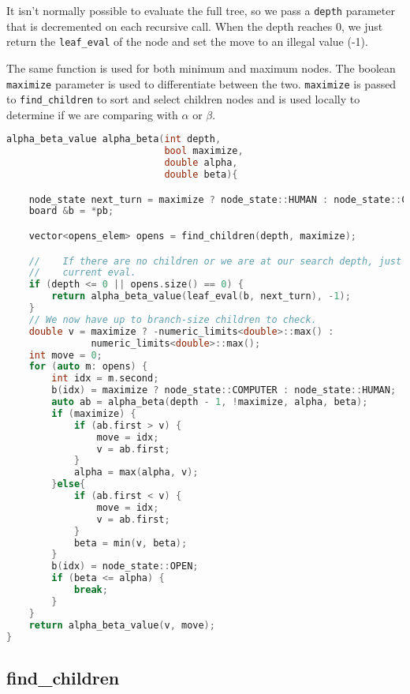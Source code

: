 \documentclass[12pt,titlepage]{amsart}
\begin{document}
It isn't normally possible to evaluate the full tree, so we pass a
\texttt{depth} parameter that is decremented on each recursive call. When the
depth reaches 0, we just return the \texttt{leaf\_eval} of the node and set the
move to an illegal value (-1).

The same function is used for both minimum and maximum nodes. The boolean
\texttt{maximize} parameter is used to differentiate between the two.
\texttt{maximize} is passed to \texttt{find\_children} to sort and select
children nodes and is used locally to determine if we are comparing with
$\alpha$ or $\beta$.

\singlespacing
\begin{lstlisting}[language=C++,float,label={lst:ab},basicstyle=\small,
                   caption=$\alpha-\beta$]
alpha_beta_value alpha_beta(int depth,
                            bool maximize,
                            double alpha,
                            double beta){

    node_state next_turn = maximize ? node_state::HUMAN : node_state::COMPUTER;
    board &b = *pb;

    vector<opens_elem> opens = find_children(depth, maximize);

    //    If there are no children or we are at our search depth, just return
    //    current eval.
    if (depth <= 0 || opens.size() == 0) {
        return alpha_beta_value(leaf_eval(b, next_turn), -1);
    }
    // We now have up to branch-size children to check.
    double v = maximize ? -numeric_limits<double>::max() :
               numeric_limits<double>::max();
    int move = 0;
    for (auto m: opens) {
        int idx = m.second;
        b(idx) = maximize ? node_state::COMPUTER : node_state::HUMAN;
        auto ab = alpha_beta(depth - 1, !maximize, alpha, beta);
        if (maximize) {
            if (ab.first > v) {
                move = idx;
                v = ab.first;
            }
            alpha = max(alpha, v);
        }else{
            if (ab.first < v) {
                move = idx;
                v = ab.first;
            }
            beta = min(v, beta);
        }
        b(idx) = node_state::OPEN;
        if (beta <= alpha) {
            break;
        }
    }
    return alpha_beta_value(v, move);
}
\end{lstlisting}
\doublespacing
\subsection{find\_children}
\end{document}
